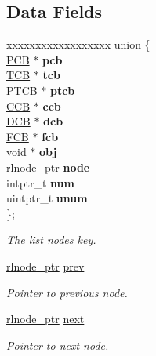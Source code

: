 \subsection*{Data Fields}
\begin{DoxyCompactItemize}
\item 
\begin{tabbing}
xx\=xx\=xx\=xx\=xx\=xx\=xx\=xx\=xx\=\kill
union \{\\
\>\hyperlink{group__proc_gadf327f09ee935cf1734c14e8849f0421}{PCB} $\ast$ {\bfseries pcb}\\
\>\hyperlink{group__scheduler_gaf88d9c946bf70b36a1e8bc34383abfc9}{TCB} $\ast$ {\bfseries tcb}\\
\>\hyperlink{structprocess__thread__control__block}{PTCB} $\ast$ {\bfseries ptcb}\\
\>\hyperlink{group__scheduler_ga7485b31e0dd9fd723bc2d75fba5206a0}{CCB} $\ast$ {\bfseries ccb}\\
\>\hyperlink{group__dev_gaf0e2d4a982667466d84f6fb7522611d6}{DCB} $\ast$ {\bfseries dcb}\\
\>\hyperlink{group__streams_ga0c7e751afb9d6cadebf070961804d400}{FCB} $\ast$ {\bfseries fcb}\\
\>void $\ast$ {\bfseries obj}\\
\>\hyperlink{group__rlists_gaae2ea9be18d20f0c80a62a2f8e2eed4d}{rlnode\_ptr} {\bfseries node}\\
\>intptr\_t {\bfseries num}\\
\>uintptr\_t {\bfseries unum}\\
\}; \\

\end{tabbing}\begin{DoxyCompactList}\small\item\em The list node\textquotesingle{}s key. \end{DoxyCompactList}\item 
\mbox{\label{structresource__list__node_a280b77fdcee186bcaade02f76322d183}} 
\hyperlink{group__rlists_gaae2ea9be18d20f0c80a62a2f8e2eed4d}{rlnode\+\_\+ptr} \hyperlink{structresource__list__node_a280b77fdcee186bcaade02f76322d183}{prev}
\begin{DoxyCompactList}\small\item\em Pointer to previous node. \end{DoxyCompactList}\item 
\mbox{\label{structresource__list__node_a04b1ee9524cd800f14de2925141e3762}} 
\hyperlink{group__rlists_gaae2ea9be18d20f0c80a62a2f8e2eed4d}{rlnode\+\_\+ptr} \hyperlink{structresource__list__node_a04b1ee9524cd800f14de2925141e3762}{next}
\begin{DoxyCompactList}\small\item\em Pointer to next node. \end{DoxyCompactList}\end{DoxyCompactItemize}


